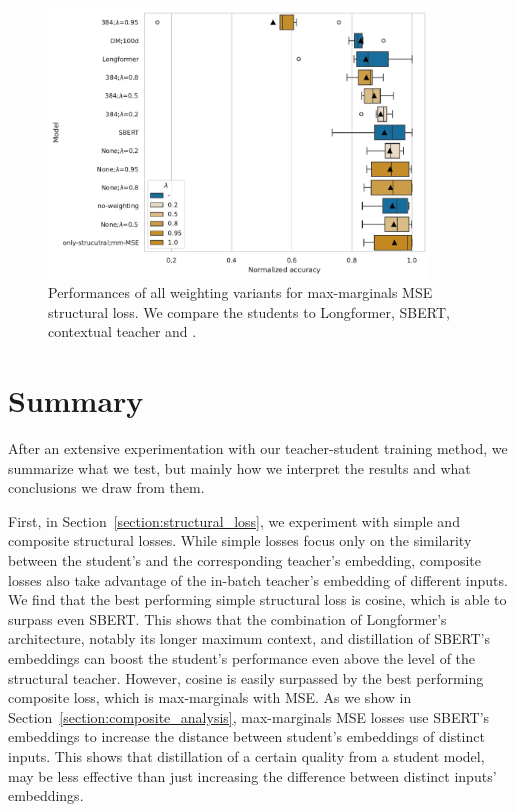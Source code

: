 \begin{figure}

  \includegraphics[width=0.9\textwidth]{img/mm_mse_weighting.pdf}

  \caption{Performances of all weighting variants for max-marginals MSE
  structural loss. We compare the students to Longformer, SBERT,
   contextual teacher and .}

  \label{fig:mm_mse_weighting}

\end{figure}

\section{Summary}\label{section:experiments_summary}

After an extensive experimentation with our teacher-student training method, we
summarize what we test, but mainly how we interpret the results and what
conclusions we draw from them.

First, in Section~\ref{section:structural_loss}, we experiment with simple and
composite structural losses. While simple losses focus only on the similarity
between the student's and the corresponding teacher's embedding, composite
losses also take advantage of the in-batch teacher's embedding of different
inputs. We find that the best performing simple structural loss is cosine,
which is able to surpass even SBERT. This shows that the combination of
Longformer's architecture, notably its longer maximum context, and distillation
of SBERT's embeddings can boost the student's performance even above the level
of the structural teacher. However, cosine is easily surpassed by the best
performing composite loss, which is max-marginals with MSE. As we show in
Section~\ref{section:composite_analysis}, max-marginals MSE losses use SBERT's
embeddings to increase the distance between student's embeddings of distinct
inputs. This shows that distillation of a certain quality from a student model,
may be less effective than just increasing the difference between distinct
inputs' embeddings.

